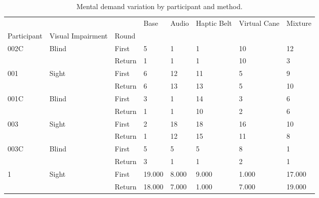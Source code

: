 
\begin{table}[!htb]
\centering
\caption{Mental demand variation by participant and method.}
\label{tab:md_var}
\begin{tabular}{llllllll}
\toprule
  &       &        &   Base & Audio & Haptic Belt & Virtual Cane & Mixture \\
Participant & Visual Impairment & Round &        &       &             &              &         \\
\midrule
002C & Blind & First &      5 &     1 &           1 &           10 &      12 \\
  &       & Return &      1 &     1 &           1 &           10 &       3 \\
001 & Sight & First &      6 &    12 &          11 &            5 &       9 \\
  &       & Return &      6 &    13 &          13 &            5 &      10 \\
001C & Blind & First &      3 &     1 &          14 &            3 &       6 \\
  &       & Return &      1 &     1 &          10 &            2 &       6 \\
003 & Sight & First &      2 &    18 &          18 &           16 &      10 \\
  &       & Return &      1 &    12 &          15 &           11 &       8 \\
003C & Blind & First &      5 &     5 &           5 &            8 &       1 \\
  &       & Return &      3 &     1 &           1 &            2 &       1 \\
1 & Sight & First & 19.000 & 8.000 &       9.000 &        1.000 &  17.000 \\
  &       & Return & 18.000 & 7.000 &       1.000 &        7.000 &  19.000 \\
\bottomrule
\end{tabular}
\end{table}

